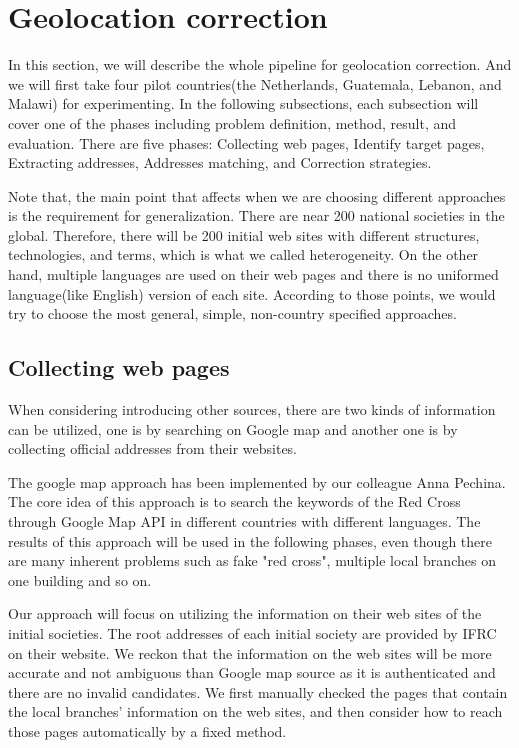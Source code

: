 \documentclass[sigchi]{acmart}
\begin{document}
\section{Geolocation correction}\label{sec:Geolocation correction}
In this section, we will describe the whole pipeline for geolocation correction. And we will first take four pilot countries(the Netherlands, Guatemala, Lebanon, and Malawi)  for experimenting. In the following subsections, each subsection will cover one of the phases including problem definition, method, result, and evaluation. There are five phases: Collecting web pages, Identify target pages, Extracting addresses, Addresses matching, and Correction strategies.

Note that, the main point that affects when we are choosing different approaches is the requirement for generalization. There are near 200 national societies in the global. Therefore, there will be 200 initial web sites with different structures, technologies, and terms, which is what we called heterogeneity. On the other hand, multiple languages are used on their web pages and there is no uniformed language(like English) version of each site. According to those points, we would try to choose the most general, simple, non-country specified approaches.

\subsection{Collecting web pages}
When considering introducing other sources, there are two kinds of information can be utilized, one is by searching on Google map and another one is by collecting official addresses from their websites.

The google map approach has been implemented by our colleague Anna Pechina. The core idea of this approach is to search the keywords of the Red Cross through Google Map API in different countries with different languages. The results of this approach will be used in the following phases, even though there are many inherent problems such as fake "red cross", multiple local branches on one building and so on. 

Our approach will focus on utilizing the information on their web sites of the initial societies. The root addresses of each initial society are provided by IFRC on their website. We reckon that the information on the web sites will be more accurate and not ambiguous than Google map source as it is authenticated and there are no invalid candidates. We first manually checked the pages that contain the local branches' information on the web sites, and then consider how to reach those pages automatically by a fixed method. 
\end{document}
